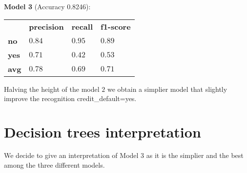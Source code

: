 \medskip

\textbf{Model 3} (Accuracy 0.8246):

\begin{table}[h]
\centering
\begin{adjustbox}{width=.30\textwidth}
\small
\begin{tabular}{llll}
               & \textbf{precision} & \textbf{recall} & \textbf{f1-score} \\ \rowcolor[HTML]{EFEFEF} 
 \textbf{no}   &  $0.84$            & $0.95$          & $0.89$            \\
 \textbf{yes}  &  $0.71$            & $0.42$          & $0.53$            \\ \rowcolor[HTML]{EFEFEF} 
 \textbf{avg}  &  $0.78$            & $0.69$          & $0.71$            \\
\end{tabular}
\end{adjustbox}
\end{table}

Halving the height of the model $2$ we obtain a simplier model that slightly improve the recognition credit\_default=yes. 

\section{Decision trees interpretation}

We decide to give an interpretation of Model 3 as it is the simplier and the best among the three different models. 
